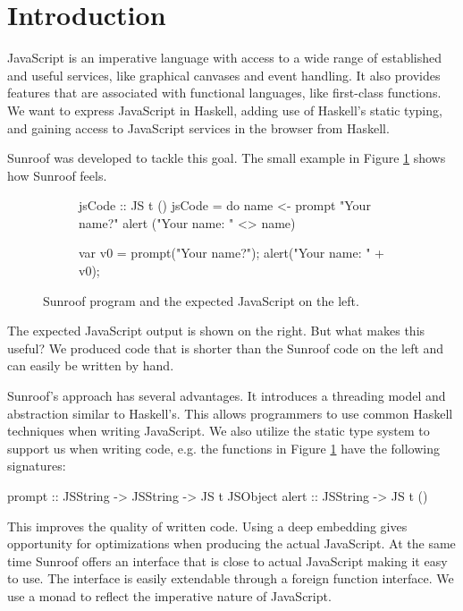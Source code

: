  
\section{Introduction}

JavaScript is an imperative language with access to a wide range
of established and useful services, like graphical canvases and event
handling. It also provides features that are associated with 
functional languages, like first-class functions. 
We want to express JavaScript in Haskell, adding use
of Haskell's static typing, and gaining access to JavaScript services
in the browser from Haskell.

Sunroof was developed to tackle this goal.
The small example in Figure \ref{fig:code-example} 
shows how Sunroof feels.
\begin{figure}[h]
\vspace{-0.5cm}
\centering
\begin{subfigure}{0.45\textwidth}%
\begin{Code}
 jsCode :: JS t ()
 jsCode = do
   name <- prompt "Your name?"
   alert ("Your name: " <> name)
\end{Code}%
\end{subfigure}%
\hfill%
\begin{subfigure}{0.45\textwidth}
\vspace{0.25cm}%
\begin{Code}
  
  
var v0 = prompt("Your name?"); 
alert("Your name: " + v0);
\end{Code}%
\end{subfigure}%
\caption{Sunroof program and the expected JavaScript on the left.}%
\label{fig:code-example}%
\vspace{-0.5cm}
\end{figure}
The expected JavaScript output is shown on the right. But what makes 
this useful? We produced code that is shorter 
than the Sunroof code on the left and can easily be written by hand.

Sunroof's approach has several advantages. 
It introduces a threading model and abstraction similar
to Haskell's. This allows programmers to use common Haskell 
techniques when writing JavaScript.
We also utilize the static type system to support us when 
writing code, e.g. the functions
in Figure \ref{fig:code-example} have the following signatures:
\begin{Code}
prompt :: JSString -> JSString -> JS t JSObject
alert  :: JSString -> JS t ()
\end{Code}
This improves the quality of written code.
Using a deep embedding gives opportunity 
for optimizations when producing the actual JavaScript.
At the same time Sunroof offers an interface that is 
close to actual JavaScript making it easy to use.
The interface is easily extendable through
a foreign function interface.
We use a monad \cite{Moggi:91:ComputationMonads} 
to reflect the imperative nature of JavaScript.

